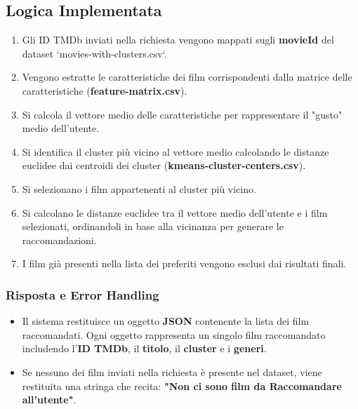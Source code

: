 \documentclass[a4paper,12pt]{article}
\begin{document}
\subsection{Logica Implementata}
\begin{enumerate}
    \item Gli ID TMDb inviati nella richiesta vengono mappati sugli \textbf{movieId} del dataset `movies-with-clusters.csv`.
    \item Vengono estratte le caratteristiche dei film corrispondenti dalla matrice delle caratteristiche (\textbf{feature-matrix.csv}).
    \item Si calcola il vettore medio delle caratteristiche per rappresentare il "gusto" medio dell'utente.
    \item Si identifica il cluster più vicino al vettore medio calcolando le distanze euclidee dai centroidi dei cluster (\textbf{kmeans-cluster-centers.csv}).
    \item Si selezionano i film appartenenti al cluster più vicino.
    \item Si calcolano le distanze euclidee tra il vettore medio dell'utente e i film selezionati, ordinandoli in base alla vicinanza per generare le raccomandazioni.
    \item I film già presenti nella lista dei preferiti vengono esclusi dai risultati finali.
\end{enumerate}

\subsubsection{Risposta e Error Handling}
\begin{itemize}
    \item Il sistema restituisce un oggetto \textbf{JSON} contenente la lista dei film raccomandati. Ogni oggetto rappresenta un singolo film raccomandato includendo l'\textbf{ID TMDb}, il \textbf{titolo}, il \textbf{cluster} e i \textbf{generi}.
    \item Se nessuno dei film inviati nella richiesta è presente nel dataset, viene restituita una stringa che recita: \textbf{"Non ci sono film da Raccomandare all'utente"}.
\end{itemize}
\end{document}
